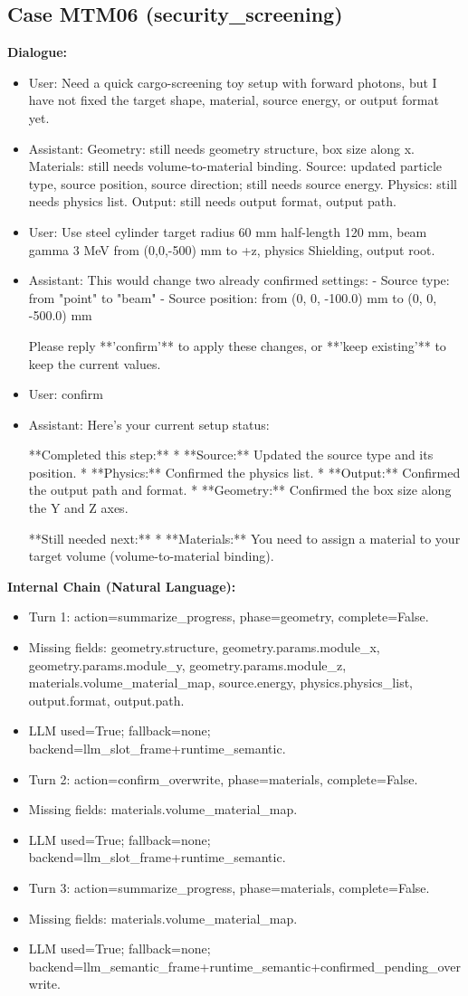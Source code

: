 \documentclass[11pt]{ctexart}
\begin{document}
\subsection{Case MTM06 (security\_screening)}
\textbf{Dialogue:}
\begin{itemize}
\item User: Need a quick cargo-screening toy setup with forward photons, but I have not fixed the target shape, material, source energy, or output format yet.
\item Assistant: Geometry: still needs geometry structure, box size along x. Materials: still needs volume-to-material binding. Source: updated particle type, source position, source direction; still needs source energy. Physics: still needs physics list. Output: still needs output format, output path.
\item User: Use steel cylinder target radius 60 mm half-length 120 mm, beam gamma 3 MeV from (0,0,-500) mm to +z, physics Shielding, output root.
\item Assistant: This would change two already confirmed settings:
- Source type: from "point" to "beam"
- Source position: from (0, 0, -100.0) mm to (0, 0, -500.0) mm

Please reply **'confirm'** to apply these changes, or **'keep existing'** to keep the current values.
\item User: confirm
\item Assistant: Here's your current setup status:

**Completed this step:**
*   **Source:** Updated the source type and its position.
*   **Physics:** Confirmed the physics list.
*   **Output:** Confirmed the output path and format.
*   **Geometry:** Confirmed the box size along the Y and Z axes.

**Still needed next:**
*   **Materials:** You need to assign a material to your target volume (volume-to-material binding).
\end{itemize}
\textbf{Internal Chain (Natural Language):}
\begin{itemize}
\item Turn 1: action=summarize\_progress, phase=geometry, complete=False.
\item Missing fields: geometry.structure, geometry.params.module\_x, geometry.params.module\_y, geometry.params.module\_z, materials.volume\_material\_map, source.energy, physics.physics\_list, output.format, output.path.
\item LLM used=True; fallback=none; backend=llm\_slot\_frame+runtime\_semantic.
\item Turn 2: action=confirm\_overwrite, phase=materials, complete=False.
\item Missing fields: materials.volume\_material\_map.
\item LLM used=True; fallback=none; backend=llm\_slot\_frame+runtime\_semantic.
\item Turn 3: action=summarize\_progress, phase=materials, complete=False.
\item Missing fields: materials.volume\_material\_map.
\item LLM used=True; fallback=none; backend=llm\_semantic\_frame+runtime\_semantic+confirmed\_pending\_overwrite.
\end{itemize}
\end{document}
